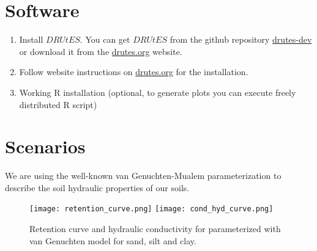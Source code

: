 \documentclass[
10pt, %
a4paper, %
oneside, %
headinclude,footinclude, %
BCOR5mm, %
]{scrartcl}
\begin{document}
\section{Software}

\begin{enumerate}
\item Install $DRUtES$. You can get $DRUtES$ from the github repository \href{https://github.com/michalkuraz/drutes-dev/} {drutes-dev} or download it from the \href{http://drutes.org/public/?core=account}{drutes.org} website. 
\item Follow website instructions on \href{http://drutes.org/public/?core=account}{drutes.org} for the installation.
\item Working R installation (optional, to generate plots you can execute freely distributed R script) 
\end{enumerate}

\newpage
\section{Scenarios}

We are using the well-known van Genuchten-Mualem parameterization to describe the soil hydraulic properties of our soils. 

\begin{table}[!h]
\centering
\caption{\label{tab_heat}Material properties needed for scenarios.}
\end{table}
\begin{figure}[!h]

\texttt{[image: retention\_curve.png]}
\texttt{[image: cond\_hyd\_curve.png]}
\caption{Retention curve and hydraulic conductivity for parameterized with van Genuchten model for sand, silt and clay.}
\end{figure}
\end{document}
